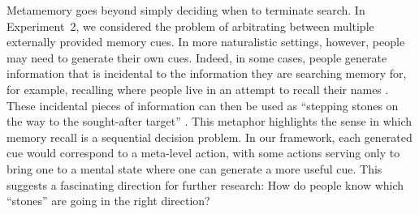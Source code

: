 
Metamemory goes beyond simply deciding when to terminate search. In Experiment~2, we considered the problem of arbitrating between multiple externally provided memory cues. In more naturalistic settings, however, people may need to generate their own cues. Indeed, in some cases, people generate information that is incidental to the information they are searching memory for, for example, recalling where people live in an attempt to recall their names \citep{williams1981process}. These incidental pieces of information can then be used as ``stepping stones on the way to the sought-after target'' \citep{koriat2000control}. This metaphor highlights the sense in which memory recall is a sequential decision problem. In our framework, each generated cue would correspond to a meta-level action, with some actions serving only to bring one to a mental state where one can generate a more useful cue. This suggests a fascinating direction for further research: How do people know which ``stones'' are going in the right direction?


